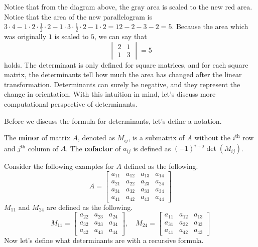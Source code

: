 \documentclass[../../../main.tex]{subfiles}
\begin{document}
Notice that from the diagram above, the gray area is scaled to the
new red area. Notice that the area of the new parallelogram is
$3 \cdot 4 - 1 \cdot 2 \cdot \frac{1}{2} \cdot 2 - 1 \cdot 3 \cdot
\frac{1}{2} \cdot 2 - 1 \cdot 2 = 12 - 2 - 3 - 2 = 5$. Because
the area which was originally $1$ is scaled to $5$, we can say that
\[
\begin{vmatrix}
    2 & 1 \\
    1 & 3
\end{vmatrix}
= 5
\]
holds. The determinant is only defined for square matrices, and for
each square matrix, the determinants tell how much the area has
changed after the linear transformation. Determinants can surely
be negative, and they represent the change in orientation.
With this intuition in mind, let's discuss more computational
perspective of determinants.

Before we discuss the formula for determinants, let's define a
notation.

\begin{definition}{}{}
The \textbf{minor} of matrix $A$, denoted as $M_{ij}$, is a submatrix
of $A$ without the $i^\text{th}$ row and $j^\text{th}$ column of $A$.
The \textbf{cofactor} of $a_{ij}$ is defined as $(-1)^{i+j}
\det(M_{ij})$.
\end{definition}

Consider the following examples for $A$ defined as the following.
\[
A =
\begin{bmatrix}
    a_{11} & a_{12} & a_{13} & a_{14} \\
    a_{21} & a_{22} & a_{23} & a_{24} \\
    a_{31} & a_{32} & a_{33} & a_{34} \\
    a_{41} & a_{42} & a_{43} & a_{44}
\end{bmatrix}
\]
$M_{11}$ and $M_{24}$ are defined as the following.
\[
M_{11} =
\begin{bmatrix}
    a_{22} & a_{23} & a_{24} \\
    a_{32} & a_{33} & a_{34} \\
    a_{42} & a_{43} & a_{44}
\end{bmatrix}, \quad
M_{24} =
\begin{bmatrix}
    a_{11} & a_{12} & a_{13} \\
    a_{31} & a_{32} & a_{33} \\
    a_{41} & a_{42} & a_{43}
\end{bmatrix}
\]
Now let's define what determinants are with a recursive formula.
\end{document}
